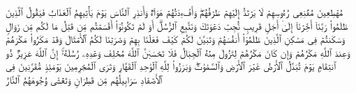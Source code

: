 \stopbuffer
\startbuffer[\q:14:43]
مُهۡطِعِینَ مُقۡنِعِی رُءُوسِهِمۡ لَا یَرۡتَدُّ إِلَیۡهِمۡ طَرۡفُهُمۡۖ وَأَفۡءِدَتُهُمۡ هَوَاۤءࣱ%
\stopbuffer
\startbuffer[\q:14:44]
وَأَنذِرِ ٱلنَّاسَ یَوۡمَ یَأۡتِیهِمُ ٱلۡعَذَابُ فَیَقُولُ ٱلَّذِینَ ظَلَمُوا۟ رَبَّنَاۤ أَخِّرۡنَاۤ إِلَىٰۤ أَجَلࣲ قَرِیبࣲ نُّجِبۡ دَعۡوَتَكَ وَنَتَّبِعِ ٱلرُّسُلَۗ أَوَ لَمۡ تَكُونُوۤا۟ أَقۡسَمۡتُم مِّن قَبۡلُ مَا لَكُم مِّن زَوَالࣲ%
\stopbuffer
\startbuffer[\q:14:45]
وَسَكَنتُمۡ فِی مَسَٰكِنِ ٱلَّذِینَ ظَلَمُوۤا۟ أَنفُسَهُمۡ وَتَبَیَّنَ لَكُمۡ كَیۡفَ فَعَلۡنَا بِهِمۡ وَضَرَبۡنَا لَكُمُ ٱلۡأَمۡثَالَ%
\stopbuffer
\startbuffer[\q:14:46]
وَقَدۡ مَكَرُوا۟ مَكۡرَهُمۡ وَعِندَ ٱللَّهِ مَكۡرُهُمۡ وَإِن كَانَ مَكۡرُهُمۡ لِتَزُولَ مِنۡهُ ٱلۡجِبَالُ%
\stopbuffer
\startbuffer[\q:14:47]
فَلَا تَحۡسَبَنَّ ٱللَّهَ مُخۡلِفَ وَعۡدِهِۦ رُسُلَهُۥۤۚ إِنَّ ٱللَّهَ عَزِیزࣱ ذُو ٱنتِقَامࣲ%
\stopbuffer
\startbuffer[\q:14:48]
یَوۡمَ تُبَدَّلُ ٱلۡأَرۡضُ غَیۡرَ ٱلۡأَرۡضِ وَٱلسَّمَٰوَٰتُۖ وَبَرَزُوا۟ لِلَّهِ ٱلۡوَٰحِدِ ٱلۡقَهَّارِ%
\stopbuffer
\startbuffer[\q:14:49]
وَتَرَى ٱلۡمُجۡرِمِینَ یَوۡمَئِذࣲ مُّقَرَّنِینَ فِی ٱلۡأَصۡفَادِ%
\stopbuffer
\startbuffer[\q:14:50]
سَرَابِیلُهُم مِّن قَطِرَانࣲ وَتَغۡشَىٰ وُجُوهَهُمُ ٱلنَّارُ%
\stopbuffer
